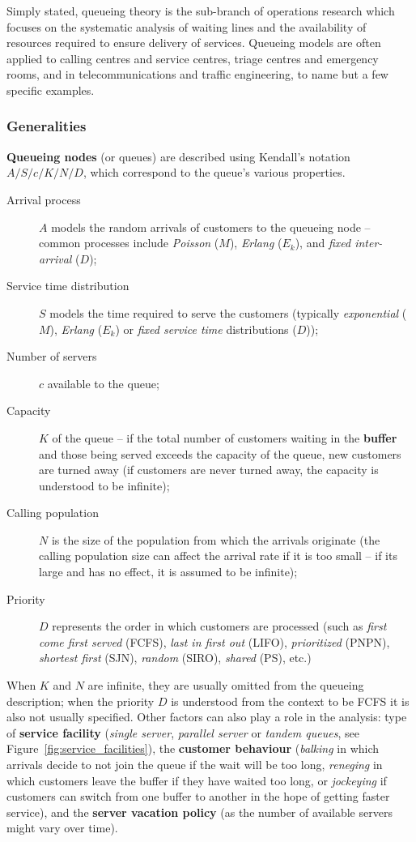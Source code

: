 Simply stated, queueing theory is the sub-branch of operations research which focuses on the systematic analysis of waiting lines and the availability of resources required to ensure delivery of services. Queueing models are often applied to calling centres and service centres, triage centres and emergency rooms, and in telecommunications and traffic engineering, to name but a few specific examples.\subsubsection{Generalities} \textbf{Queueing nodes} (or queues) are described using Kendall's notation $A/S/c/K/N/D$, which correspond to the queue's various properties. 
\begin{description}
\item[Arrival process] $A$ models the random arrivals of customers to the queueing node -- common processes include \textit{Poisson} ($M$), \textit{Erlang} ($E_k$), and \textit{fixed inter-arrival} ($D$); 
\item[Service time distribution] $S$  models the time required to serve the customers (typically \textit{exponential} ($M$), \textit{Erlang} ($E_k$) or \textit{fixed service time} distributions ($D$));
\item[Number of servers] $c$ available to the queue;
\item[Capacity] $K$ of the queue  -- if the total number of customers waiting in the \textbf{buffer} and those being served exceeds the capacity of the queue, new customers are turned away (if customers are never turned away, the capacity is understood to be infinite); 
\item[Calling population] $N$ is the size of the population from which the arrivals originate (the calling population size can affect the arrival rate if it is too small -- if its large and has no effect, it is assumed to be infinite);
\item[Priority] $D$ represents the order in which customers are processed (such as \textit{first come first served} (FCFS), \textit{last in first out} (LIFO), \textit{prioritized} (PNPN), \textit{shortest first} (SJN), \textit{random} (SIRO), \textit{shared} (PS), etc.)
\end{description}
When $K$ and $N$ are infinite, they are usually omitted from the queueing description; when the priority $D$ is understood from the context to be FCFS it is also not usually specified.\newl  
Other factors can also play a role in the analysis: type of \textbf{service facility} (\textit{single server}, \textit{parallel server} or \textit{tandem queues}, see Figure~\ref{fig:service_facilities}), the \textbf{customer behaviour} (\textit{balking} in which arrivals decide to not join the queue if the wait will be too long, \textit{reneging} in which customers leave the buffer if they have waited too long, or \textit{jockeying} if customers can switch from one buffer to another in the hope of getting faster service), and the \textbf{server vacation policy} (as the number of available servers might vary over time).      
